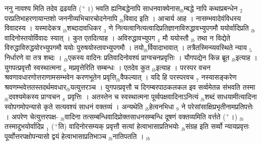 \documentclass[article,12pt,a4paper]{memoir}%
\newcommand{\add}[1]{($^{+}$#1)}
\newcounter{parCount}
\begin{document}
	  
	  \pstart \leavevmode%
	\hphantom{.}{\color{DodgerBlue3}ननु नावश्य} मिति तदेव द्रढयति \add{।} भवति ह्यनिबद्धेनापि साधनवाक्येनास{\tiny $_{lb}$}म्बद्धे नापि कथाप्रबन्धेन {\tiny $_{2}$} परप्रतिभाहरणायान्तशो जननीव्यभिचारचोदनेनापि {\tiny $_{lb}$}विवाद इति । आचार्य आह । नासम्भवादेवंविधस्य विवादस्य । यस्मादेकत्र {\tiny $_{lb}$}शब्दादावधिकर {\tiny $_{3}$} णे नित्यत्वानित्यत्वादिप्रतिज्ञानाविरुद्धावभ्युपगमौ ययोर्वादिप्रति {\tiny $_{lb}$}वादिनोस्तयोर्विवादः स्यात् । कुत एतदित्याह । अविरुद्धावभ्युपग {\tiny $_{4}$} मौ ययोस्तौ {\tiny $_{lb}$} \leavevmode{} तथा न विद्येते विरुद्धाविरुद्धयोरभ्युपगमौ ययोः पुरुषयोस्तावभ्युपगमौ । तयो{\tiny $_{lb}$}र्विवादाभावात् । तत्रैतस्मिन्व्यवस्थिते न्याय {\tiny $_{5}$} निर्धारणे वा तत्र शब्दः । {\tiny $_{lb}$}एकस्य वादिनः प्रतिवादिनोवश्यं प्राग्वचनप्रवृत्तिः । यौगपद्येन किन्न ब्रूत {\tiny $_{lb}$}इत्याह । {\color{DodgerBlue3}युगपत्प्रवृत्तौ} स्वस्थात्मना {\tiny $_{6}$} मप्रवृत्तेरिति सम्बन्धः । एतदेव कुत {\tiny $_{lb}$}इत्याह । परस्पर वचन श्रवणावधारणोत्तराणामसम्भवेन करणभूतेन प्रवृत्ति{\tiny $_{lb}$}वैफल्यात् । यदि हि परस्परवच {\tiny $_{7}$} नस्यासङ्करेण श्रवणम्भवेत्ततस्तदर्थमवधार{\tiny $_{lb}$}यत्युत्तरञ्च । युगपत्प्रवृत्तौ च दिगम्बरपाठकलकल इव सर्व्वमेतन्न संभवति तस्मा{\tiny $_{lb}$}दवश्यमेकस्य प्राग्वचन {\tiny $_{8}$} प्रवृत्तिः । अतस्तेन च स्वस्थात्मना पूर्व्वपक्षवादिनाऽनित्यं {\tiny $_{lb}$}शब्दं साधयामीत्यादिना स्वोपगमोपन्यासे कृते सत्यवश्यं साधनं वक्तव्यं । अन्यथेति {\tiny $_{lb}$}हेत्वनभिधा {\tiny $_{9}$} \leavevmode{} ने परेसांसाक्षिप्रभृतीनामप्रतिपत्तेः । अपरेण चेत्युत्तरपक्ष- {\tiny $_{lb}$}वादिना तत्सम्बन्धिवादिप्रोक्तसाधनसम्बन्धि दूषणं वक्तव्यमिति वर्त्तते \add{।} {\tiny $_{lb}$}तस्मादुभयोर्वादिप्र {\tiny $_{1}$} \add{ति} वादिनोरसम्यक् प्रवृत्तौ सत्यां हेत्वाभासाप्रतिभयोः {\tiny $_{lb}$}संग्रह इति सर्व्वो न्यायप्रवृत्तः पूर्व्वोत्तरपक्षोपन्यासो द्वयं हेत्वाभासाप्रतिभाञ्च {\tiny $_{lb}$}नातिपतति ।
	{}
	\pend%
      {\tiny $_{lb}$}
\end{document}
